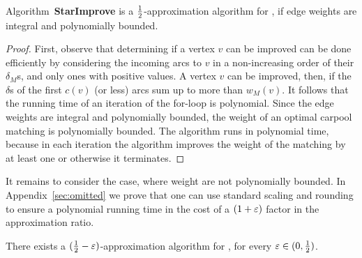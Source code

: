 \begin{theorem}
\label{thm:improve-bounded}
Algorithm~\textbf{StarImprove} is a $\frac{1}{2}$-approximation algorithm
for \carpool, if edge weights are integral and polynomially bounded.
\end{theorem}
\begin{proof}
First, observe that determining if a vertex $v$ can be improved can be
done efficiently by considering the incoming arcs to $v$ in a
non-increasing order of their $\delta_M$s, and only ones with positive
values.  A vertex $v$ can be improved, then, if the $\delta$s of the
first $c(v)$ (or less) arcs sum up to more than $w_M(v)$.
%
It follows that the running time of an iteration of the for-loop is
polynomial.  Since the edge weights are integral and polynomially
bounded, the weight of an optimal carpool matching is polynomially
bounded.  The algorithm runs in polynomial time, because in each
iteration the algorithm improves the weight of the matching by at
least one or otherwise it terminates.
\end{proof}

It remains to consider the case, where weight are not polynomially
bounded.  In Appendix~\ref{sec:omitted} we prove that one can use
standard scaling and rounding to ensure a polynomial running time in
the cost of a $(1+\varepsilon)$ factor in the approximation ratio.

\begin{theorem}
\label{thm:improve}
There exists a $(\frac{1}{2}-\varepsilon)$-approximation algorithm for \carpool,
for every $\varepsilon \in (0,\frac{1}{2})$.
\end{theorem}
